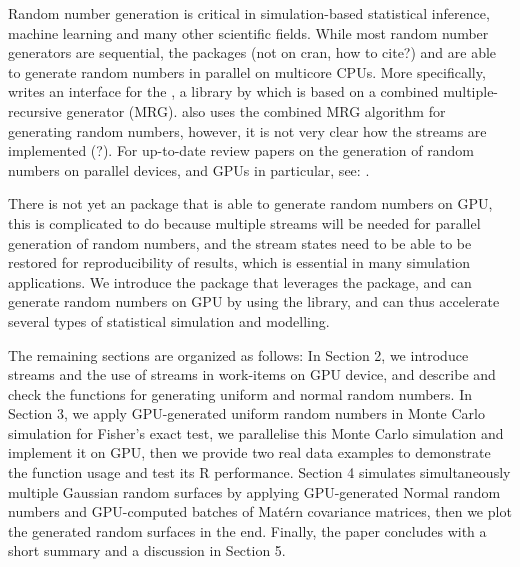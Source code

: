 \documentclass[article,nojss]{jss}\usepackage[]{graphicx}\usepackage[]{color}
\begin{document}
\begin{leftbar}
Random number generation is critical in simulation-based statistical inference, machine learning and many other scientific fields. While most random number generators are sequential, the  packages  (not on cran, how to cite?) and  \citep*{future1.19.1} are able to generate random numbers in parallel on multicore CPUs. More specifically,  writes an interface for the , a  library by \cite{l2002object} which is based on a combined multiple-recursive generator (MRG).  also uses the combined MRG algorithm for generating random numbers, however, it is not very clear how the streams are implemented (?). For up-to-date review papers on the generation of random numbers on parallel devices, and GPUs in particular, see:  \cite{rLEC15a,rLEC17p,rLEC21a}.


There is not yet an  package that is able to generate random numbers on GPU, this is complicated to do because multiple streams will be needed for parallel generation of random numbers, and the stream states need to be able to be restored for reproducibility of results, which is essential in many simulation applications.  We introduce the  package  that leverages the  package, and can generate random numbers on GPU by using the  \citep{l2015clrng} library, and can thus accelerate several types of statistical simulation and modelling.



The remaining sections are organized as follows:
In Section 2, we introduce streams and the use of streams in work-items on GPU device, and describe and check the functions for generating uniform and normal random numbers.
In Section 3, we apply GPU-generated uniform random numbers in Monte Carlo simulation for Fisher’s exact test, we parallelise this Monte Carlo simulation and implement it on GPU, then we provide two real data examples to demonstrate the function usage and test its R performance.
Section 4 simulates simultaneously multiple Gaussian random surfaces by applying GPU-generated Normal random numbers and GPU-computed batches of Mat\'ern covariance matrices, then we plot the generated random surfaces in the end. 
Finally, the paper concludes with a short summary and a discussion in Section 5.



\end{leftbar}
\end{document}
